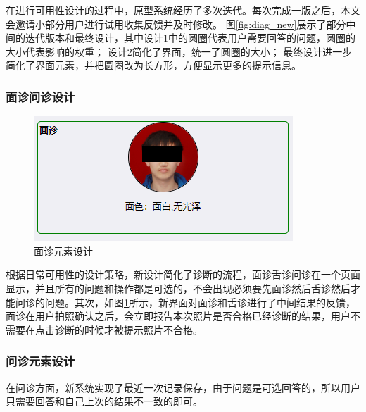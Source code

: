 在进行可用性设计的过程中，原型系统经历了多次迭代。每次完成一版之后，本文会邀请小部分用户进行试用收集反馈并及时修改。
图\ref{fig:diag_new}展示了部分中间的迭代版本和最终设计，其中设计1中的圆圈代表用户需要回答的问题，圆圈的大小代表影响的权重；
设计2简化了界面，统一了圆圈的大小；
最终设计进一步简化了界面元素，并把圆圈改为长方形，方便显示更多的提示信息。

\subsubsection{面诊问诊设计}

\begin{figure}[h]
    \centering
    \includegraphics[]{images/diag_design.png}
    \caption{面诊元素设计}
    \label{fig:diag_design}
\end{figure}

根据日常可用性的设计策略，新设计简化了诊断的流程，面诊舌诊问诊在一个页面显示，并且所有的问题和操作都是可选的，不会出现必须要先面诊然后舌诊然后才能问诊的问题。其次，如图\ref{fig:diag_design}所示，新界面对面诊和舌诊进行了中间结果的反馈，面诊在用户拍照确认之后，会立即报告本次照片是否合格已经诊断的结果，用户不需要在点击诊断的时候才被提示照片不合格。

\subsubsection{问诊元素设计}
在问诊方面，新系统实现了最近一次记录保存，由于问题是可选回答的，所以用户只需要回答和自己上次的结果不一致的即可。

